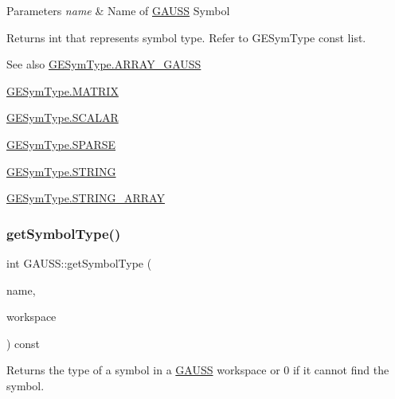 \begin{DoxyParams}{Parameters}
{\em name} & Name of \hyperlink{class_g_a_u_s_s}{G\+A\+U\+SS} Symbol \\
\hline
\end{DoxyParams}
\begin{DoxyReturn}{Returns}
int that represents symbol type. Refer to G\+E\+Sym\+Type const list.
\end{DoxyReturn}
\begin{DoxySeeAlso}{See also}
\hyperlink{struct_g_e_sym_type__s_ae49660fdf27d7d165463abb2ccc941e4}{G\+E\+Sym\+Type.\+A\+R\+R\+A\+Y\+\_\+\+G\+A\+U\+SS} 

\hyperlink{struct_g_e_sym_type__s_a3874c4c2df1ed454c13722031e582f66}{G\+E\+Sym\+Type.\+M\+A\+T\+R\+IX} 

\hyperlink{struct_g_e_sym_type__s_a4868e0d2833270b164c4a78b497f4fdc}{G\+E\+Sym\+Type.\+S\+C\+A\+L\+AR} 

\hyperlink{struct_g_e_sym_type__s_a17bff9bfcefd9f4c639d20d256f20a7d}{G\+E\+Sym\+Type.\+S\+P\+A\+R\+SE} 

\hyperlink{struct_g_e_sym_type__s_a0e719c96f22a8453e460f7d87a09696a}{G\+E\+Sym\+Type.\+S\+T\+R\+I\+NG} 

\hyperlink{struct_g_e_sym_type__s_a8b841bad6dacbbacf0d423219bd08a98}{G\+E\+Sym\+Type.\+S\+T\+R\+I\+N\+G\+\_\+\+A\+R\+R\+AY} 
\end{DoxySeeAlso}
\mbox{\label{class_g_a_u_s_s_ad395f10e4e160edbdc8f238dc737d9fc}} 
\subsubsection{\texorpdfstring{get\+Symbol\+Type()}{getSymbolType()}\hspace{0.1cm}{\footnotesize\ttfamily [2/2]}}
{\footnotesize\ttfamily int G\+A\+U\+S\+S\+::get\+Symbol\+Type (\begin{DoxyParamCaption}\item[{std\+::string}]{name,  }\item[{\hyperlink{class_g_e_workspace}{G\+E\+Workspace} $\ast$}]{workspace }\end{DoxyParamCaption}) const}



Returns the type of a symbol in a \hyperlink{class_g_a_u_s_s}{G\+A\+U\+SS} workspace or 0 if it cannot find the symbol. 

